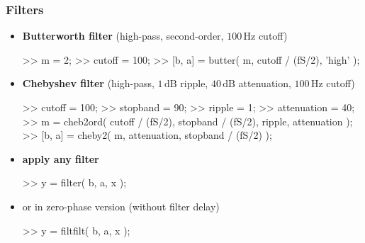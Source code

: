\begin{frame}[fragile] %
	\frametitle{Filters}
	\begin{itemize}
		\item \textbf{Butterworth filter} (high-pass, second-order, $100\,\textrm{Hz}$ cutoff)
			\begin{code}
>> m = 2; \color{medium}%
>> cutoff = 100; \color{medium}%
>> [b, a] = butter( m, cutoff / (fS/2), 'high' );
			\end{code}
		\item \textbf{Chebyshev filter} (high-pass, $1\,\textrm{dB}$ ripple, $40\,\textrm{dB}$ attenuation, $100\,\textrm{Hz}$ cutoff)
			\begin{code}
>> cutoff = 100; \color{medium}%
>> stopband = 90; \color{medium}%
>> ripple = 1; \color{medium}%
>> attenuation = 40; \color{medium}%
>> m = cheb2ord( cutoff / (fS/2), stopband / (fS/2), ripple, attenuation );
>> [b, a] = cheby2( m, attenuation, stopband / (fS/2) );
			\end{code}
		\item \textbf{apply any filter}
			\begin{code}
>> y = filter( b, a, x ); \color{medium}%
			\end{code}
		\item or in zero-phase version (without filter delay)
			\begin{code}
>> y = filtfilt( b, a, x ); \color{medium}%
			\end{code}
	\end{itemize}
\end{frame}

